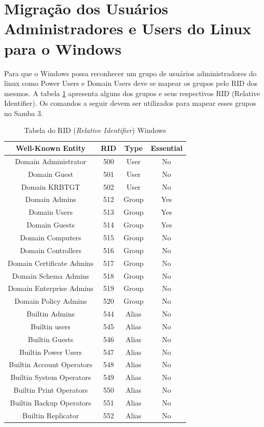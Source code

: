 \section{Migração dos Usuários Administradores e Users do Linux para o Windows}

Para que o Windows possa reconhecer um grupo de usuários administradores do linux como Power Users e Domain Users deve se mapear os grupos pelo RID dos mesmos. A tabela \ref{tab} apresenta alguns dos grupos e seus respectivos RID (Relative Identifier). Os comandos a seguir devem ser utilizados para mapear esses grupos no Samba 3.

\begin{table}[h!]
	\centering
	\caption{Tabela do RID (\textit{Relative Identifier}) Windows \cite{RID}}
	\begin{tabular}{cccc}
		
		\hline
		
		Well-Known Entity & RID & Type &	Essential \\
		
		\hline
		
		\hline
		
		Domain Administrator & 500 & User & No \\
		Domain Guest & 501 & User & No \\		
		Domain KRBTGT & 502	& User & No \\
		Domain Admins & 512 & Group & Yes \\
		Domain Users & 513 & Group & Yes \\
		Domain Guests & 514 & Group & Yes \\
		Domain Computers & 515 & Group & No \\
		Domain Controllers & 516 & Group & No \\
		Domain Certificate Admins & 517 & Group & No \\
		Domain Schema Admins & 518 & Group & No \\		
		Domain Enterprise Admins & 519 & Group & No \\
		Domain Policy Admins & 520 & Group & No \\
		Builtin Admins & 544 & Alias & No \\
		Builtin users & 545 & Alias & No \\
		Builtin Guests & 546 & Alias & No \\
		Builtin Power Users & 547 & Alias & No \\
		Builtin Account Operators & 548 & Alias & No \\
		Builtin System Operators & 549 & Alias & No \\
		Builtin Print Operators	& 550 & Alias & No \\
		Builtin Backup Operators & 551 & Alias & No \\
		Builtin Replicator & 552 & Alias & No \\
		 	
		\hline
	\end{tabular}
	\label{tab}
\end{table}

